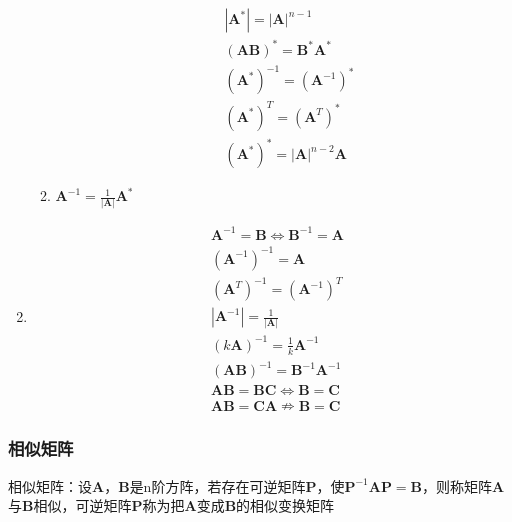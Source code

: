 \documentclass[12pt]{book}
\begin{document}
\begin{enumerate}[1.]
\begin{enumerate}[(1)]
\begin{align*}
                         & |\bm{A}^{*}| = |\bm{A}|^{n-1}                      \\
                         & (\bm{AB})^{*} = \bm{B}^{*}\bm{A}^{*}               \\
                         & (\bm{A}^{*})^{-1} = (\bm{A}^{-1})^{*}              \\
                         & (\bm{A}^{*})^{T} = (\bm{A}^{T})^{*}                \\
                         & (\bm{A}^{*})^{*} = |\bm{A}|^{n-2} \bm{A}
                    \end{align*}
              \item $ \bm{A}^{-1} = \frac{1}{|\bm{A}|}\bm{A}^{*} $
          \end{enumerate}
    \item \begin{align*}
               & \bm{A}^{-1}=\bm{B} \Leftrightarrow \bm{B}^{-1}=\bm{A} \\
               & (\bm{A}^{-1})^{-1} = \bm{A}                           \\
               & (\bm{A}^{T})^{-1} = (\bm{A}^{-1})^{T}                 \\
               & |\bm{A}^{-1}| = \frac{1}{|\bm{A}|}                    \\
               & (k \mathbf{A})^{-1} = \frac{1}{k} \mathbf{A}^{-1}     \\
               & (\bm{AB})^{-1} = \bm{B}^{-1} \bm{A}^{-1}              \\
               & \bm{AB}=\bm{BC} \Leftrightarrow \bm{B}=\bm{C}         \\
               & \bm{AB}=\bm{CA}\nRightarrow \bm{B}=\bm{C}
          \end{align*}
\end{enumerate}


\subsubsection{相似矩阵}



相似矩阵：设$\bm{A}$，$\bm{B}$是n阶方阵，若存在可逆矩阵$\bm{P}$，使$\bm{P}^{-1}\bm{AP}=\bm{B}$，则称矩阵$\bm{A}$与$\bm{B}$相似，可逆矩阵$\bm{P}$称为把$\bm{A}$变成$\bm{B}$的相似变换矩阵
\end{document}
